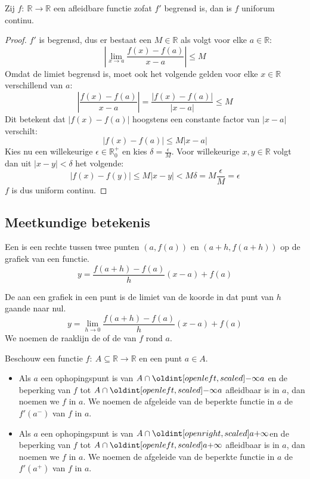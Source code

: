 \documentclass[main.tex]{subfiles}
\begin{document}
\begin{st}
  Zij $f:\ \mathbb{R} \rightarrow \mathbb{R}$ een afleidbare functie zofat $f'$ begrensd is, dan is $f$ uniforum continu.

  \begin{proof}
    $f'$ is begrensd, dus er bestaat een $M\in \mathbb{R}$ als volgt voor elke $a \in \mathbb{R}$:
    \[ \left|\lim_{x\rightarrow a}\frac{f(x)-f(a)}{x-a}\right| \le M\]
    Omdat de limiet begrensd is, moet ook het volgende gelden voor elke $x\in \mathbb{R}$ verschillend van $a$: 
    \[ \left|\frac{f(x)-f(a)}{x-a}\right| = \frac{|f(x)-f(a)|}{|x-a|} \le M \]
    Dit betekent dat $|f(x)-f(a)|$ hoogstens een constante factor van $|x-a|$ verschilt:
    \[ |f(x)-f(a)| \le M|x-a| \]
    Kies nu een willekeurige $\epsilon \in \mathbb{R}_{0}^{+}$ en kies $\delta = \frac{\epsilon}{M}$.
    Voor willekeurige $x,y \in \mathbb{R}$ volgt dan uit $|x-y|< \delta$ het volgende:
    \[ |f(x)-f(y)| \le M|x-y| < M\delta = M\frac{\epsilon}{M} = \epsilon \]
    $f$ is dus uniform continu.
\feed
  \end{proof}
\end{st}


\subsection{Meetkundige betekenis}
\label{sec:meetk-betek}

\begin{de}
  Een  is een rechte tussen twee punten $(a,f(a))$ en $(a+h,f(a+h))$ op de grafiek van een functie.
  \[ y = \frac{f(a+h) -f(a)}{h} (x-a) + f(a) \]
\end{de}

\begin{de}
  De  aan een grafiek in een punt is de limiet van de koorde in dat punt van $h$ gaande naar nul.
  \[ y = \lim_{h\rightarrow 0}\frac{f(a+h) -f(a)}{h} (x-a) + f(a) \]
  We noemen de raaklijn de  of de  van $f$ rond $a$.
\end{de}

\begin{de}
  Beschouw een functie $f:\ A \subseteq \mathbb{R} \rightarrow \mathbb{R}$ en een punt $a \in A$.
  \begin{itemize}
  \item Als $a$ een ophopingspunt is van $A \cap \interval[open left]{-\infty}{a}$ en de beperking van $f$ tot $A \cap \interval[open left]{-\infty}{a}$ afleidbaar is in $a$, dan noemen we $f$  in $a$.
    We noemen de afgeleide van de beperkte functie in $a$ de  $f'(a^{-})$ van $f$ in $a$.
  \item Als $a$ een ophopingspunt is van $A \cap \interval[open right]{a}{+\infty}$en de beperking van $f$ tot $A \cap \interval[open left]{a}{+\infty}$ afleidbaar is in $a$, dan noemen we $f$  in $a$.
    We noemen de afgeleide van de beperkte functie in $a$ de  $f'(a^{+})$ van $f$ in $a$.
  \end{itemize}
\end{de}
\end{document}
